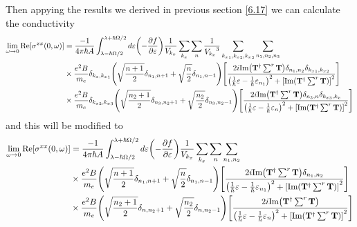 \noindent
Then appying the results we derived in previous section \eqref{6.17} we can calculate the conductivity
\begin{equation} \label{7.6}
  \begin{aligned}
    \lim_{\omega \to 0}
    \text{Re}[{\sigma}^{xx}(0,\omega)] & =
    \frac{-1}{4\pi\hbar A}
    \int_{\lambda-\hbar\Omega/2}^{\lambda+ \hbar\Omega/2} d\varepsilon
    \qty(
    -\frac{\partial f}{\partial \varepsilon})
    \frac{1}{V_{k_x}} \sum_{k_x} \sum_{n}
    \frac{1}{{V_{k_x}}^3} \sum_{{k_x}_1,{k_x}_2,{k_x}_3}
    \sum_{n_1,n_2,n_3}
    \\
    & \times
    \frac{e^2B}{{m_e}}
    \delta_{k_x,{k_x}_1}
    \qty(\sqrt{\frac{n+1}{2}} \delta_{n_1,n+1} + \sqrt{\frac{n}{2}}
    \delta_{n_1,n-1})
    \qty[
    \frac{2i \text{Im}\qty(\mathbf{T}^{\dagger} \sum^r \mathbf{T})
    \delta_{n_1,n_2}\delta_{{k_x}_1,{k_x}_2}}
    {
    \qty(
    \frac{1}{\hbar}\varepsilon -
    \frac{1}{\hbar}\varepsilon_{n_1}
    )^2
    + \qty[\text{Im}\qty(\mathbf{T}^{\dagger} \sum^r \mathbf{T})]^2
    }] \\
    & \times
    \frac{e^2B}{{m_e}}
    \delta_{{k_x}_2,{k_x}_3}
    \qty(\sqrt{\frac{n_2+1}{2}} \delta_{n_3,n_2+1} + \sqrt{\frac{n_2}{2}}
    \delta_{n_3,n_2-1})
    \qty[
    \frac{2i \text{Im}\qty(\mathbf{T}^{\dagger} \sum^r \mathbf{T})
    \delta_{n_3,n}\delta_{{k_x}_3,{k_x}}}
    {
    \qty(
    \frac{1}{\hbar}\varepsilon -
    \frac{1}{\hbar}\varepsilon_{n}
    )^2
    + \qty[\text{Im}\qty(\mathbf{T}^{\dagger} \sum^r \mathbf{T})]^2
    }]
  \end{aligned}
\end{equation}
and this will be modified to
\begin{equation} \label{7.7}
  \begin{aligned}
    \lim_{\omega \to 0}
    \text{Re}[{\sigma}^{xx}(0,\omega)] & =
    \frac{-1}{4\pi\hbar A}
    \int_{\lambda-\hbar\Omega/2}^{\lambda+ \hbar\Omega/2} d\varepsilon
    \qty(
    -\frac{\partial f}{\partial \varepsilon})
    \frac{1}{V_{k_x}} \sum_{k_x} \sum_{n}
    \sum_{n_1,n_2}
    \\
    & \times
    \frac{e^2B}{{m_e}}
    \qty(\sqrt{\frac{n+1}{2}} \delta_{n_1,n+1} + \sqrt{\frac{n}{2}}
    \delta_{n_1,n-1})
    \qty[
    \frac{2i \text{Im}\qty(\mathbf{T}^{\dagger} \sum^r \mathbf{T})
    \delta_{n_1,n_2}}
    {
    \qty(
    \frac{1}{\hbar}\varepsilon -
    \frac{1}{\hbar}\varepsilon_{n_1}
    )^2
    + \qty[\text{Im}\qty(\mathbf{T}^{\dagger} \sum^r \mathbf{T})]^2
    }] \\
    & \times
    \frac{e^2B}{{m_e}}
    \qty(\sqrt{\frac{n_2+1}{2}} \delta_{n,n_2+1} + \sqrt{\frac{n_2}{2}}
    \delta_{n,n_2-1})
    \qty[
    \frac{2i \text{Im}\qty(\mathbf{T}^{\dagger} \sum^r \mathbf{T})
    }
    {
    \qty(
    \frac{1}{\hbar}\varepsilon -
    \frac{1}{\hbar}\varepsilon_{n}
    )^2
    + \qty[\text{Im}\qty(\mathbf{T}^{\dagger} \sum^r \mathbf{T})]^2
    }]
  \end{aligned}
\end{equation}
